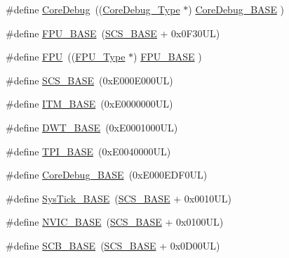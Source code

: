 \begin{DoxyCompactItemize}
\#define \hyperlink{group___c_m_s_i_s__core__base_gab6e30a2b802d9021619dbb0be7f5d63d}{Core\+Debug}~((\hyperlink{struct_core_debug___type}{Core\+Debug\+\_\+\+Type} $\ast$)     \hyperlink{group___c_m_s_i_s__core__base_ga680604dbcda9e9b31a1639fcffe5230b}{Core\+Debug\+\_\+\+B\+A\+SE}   )
\item 
\#define \hyperlink{group___c_m_s_i_s__core__base_ga4dcad4027118c098c07bcd575f1fbb28}{F\+P\+U\+\_\+\+B\+A\+SE}~(\hyperlink{group___c_m_s_i_s__core__base_ga3c14ed93192c8d9143322bbf77ebf770}{S\+C\+S\+\_\+\+B\+A\+SE} +  0x0\+F30\+U\+L)
\item 
\#define \hyperlink{group___c_m_s_i_s__core__base_gabc7c93f2594e85ece1e1a24f10591428}{F\+PU}~((\hyperlink{struct_f_p_u___type}{F\+P\+U\+\_\+\+Type}       $\ast$)     \hyperlink{group___c_m_s_i_s__core__base_ga4dcad4027118c098c07bcd575f1fbb28}{F\+P\+U\+\_\+\+B\+A\+SE}         )
\item 
\#define \hyperlink{group___c_m_s_i_s__core__base_ga3c14ed93192c8d9143322bbf77ebf770}{S\+C\+S\+\_\+\+B\+A\+SE}~(0x\+E000\+E000\+U\+L)
\item 
\#define \hyperlink{group___c_m_s_i_s__core__base_gadd76251e412a195ec0a8f47227a8359e}{I\+T\+M\+\_\+\+B\+A\+SE}~(0x\+E0000000\+U\+L)
\item 
\#define \hyperlink{group___c_m_s_i_s__core__base_gafdab534f961bf8935eb456cb7700dcd2}{D\+W\+T\+\_\+\+B\+A\+SE}~(0x\+E0001000\+U\+L)
\item 
\#define \hyperlink{group___c_m_s_i_s__core__base_ga2b1eeff850a7e418844ca847145a1a68}{T\+P\+I\+\_\+\+B\+A\+SE}~(0x\+E0040000\+U\+L)
\item 
\#define \hyperlink{group___c_m_s_i_s__core__base_ga680604dbcda9e9b31a1639fcffe5230b}{Core\+Debug\+\_\+\+B\+A\+SE}~(0x\+E000\+E\+D\+F0\+U\+L)
\item 
\#define \hyperlink{group___c_m_s_i_s__core__base_ga58effaac0b93006b756d33209e814646}{Sys\+Tick\+\_\+\+B\+A\+SE}~(\hyperlink{group___c_m_s_i_s__core__base_ga3c14ed93192c8d9143322bbf77ebf770}{S\+C\+S\+\_\+\+B\+A\+SE} +  0x0010\+U\+L)
\item 
\#define \hyperlink{group___c_m_s_i_s__core__base_gaa0288691785a5f868238e0468b39523d}{N\+V\+I\+C\+\_\+\+B\+A\+SE}~(\hyperlink{group___c_m_s_i_s__core__base_ga3c14ed93192c8d9143322bbf77ebf770}{S\+C\+S\+\_\+\+B\+A\+SE} +  0x0100\+U\+L)
\item 
\#define \hyperlink{group___c_m_s_i_s__core__base_gad55a7ddb8d4b2398b0c1cfec76c0d9fd}{S\+C\+B\+\_\+\+B\+A\+SE}~(\hyperlink{group___c_m_s_i_s__core__base_ga3c14ed93192c8d9143322bbf77ebf770}{S\+C\+S\+\_\+\+B\+A\+SE} +  0x0\+D00\+U\+L)

\end{DoxyCompactItemize}
